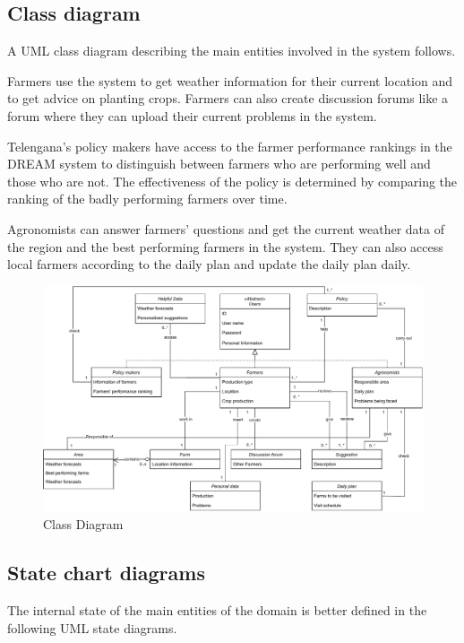 \documentclass[../../main.tex]{subfiles}
\begin{document}
\subsection{Class diagram}

A UML class diagram describing the main entities involved in the system follows.

Farmers use the system to get weather information for their current location and to get advice on planting crops.
Farmers can also create discussion forums like a forum where they can upload their current problems in the system.

Telengana's policy makers have access to the farmer performance rankings in the DREAM system to distinguish between farmers who are performing well and those who are not.
The effectiveness of the policy is determined by comparing the ranking of the badly performing farmers over time.


Agronomists can answer farmers' questions and get the current weather data of the region and the best performing farmers in the system. They can also access local farmers according to the daily plan and update the daily plan daily.

\begin{figure}[H]
\centering
\includegraphics[width=5.55in, keepaspectratio]{RASD/image/class_diagram.pdf}
\caption{Class Diagram}
\end{figure}



\subsection{State chart diagrams}

The internal state of the main entities of the domain is better defined in the following UML
state diagrams.
\end{document}
